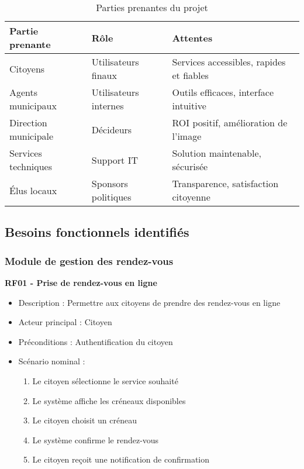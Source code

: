 \begin{table}[H]
\centering
\caption{Parties prenantes du projet}
\begin{tabular}{|l|p{5cm}|p{5cm}|}
\hline
\textbf{Partie prenante} & \textbf{Rôle} & \textbf{Attentes} \\
\hline
Citoyens & Utilisateurs finaux & Services accessibles, rapides et fiables \\
Agents municipaux & Utilisateurs internes & Outils efficaces, interface intuitive \\
Direction municipale & Décideurs & ROI positif, amélioration de l'image \\
Services techniques & Support IT & Solution maintenable, sécurisée \\
Élus locaux & Sponsors politiques & Transparence, satisfaction citoyenne \\
\hline
\end{tabular}
\end{table}

\subsection{Besoins fonctionnels identifiés}

\subsubsection{Module de gestion des rendez-vous}

\textbf{RF01 - Prise de rendez-vous en ligne}
\begin{itemize}
\item Description : Permettre aux citoyens de prendre des rendez-vous en ligne
\item Acteur principal : Citoyen
\item Préconditions : Authentification du citoyen
\item Scénario nominal :
  \begin{enumerate}
  \item Le citoyen sélectionne le service souhaité
  \item Le système affiche les créneaux disponibles
  \item Le citoyen choisit un créneau
  \item Le système confirme le rendez-vous
  \item Le citoyen reçoit une notification de confirmation
  \end{enumerate}
\end{itemize}


